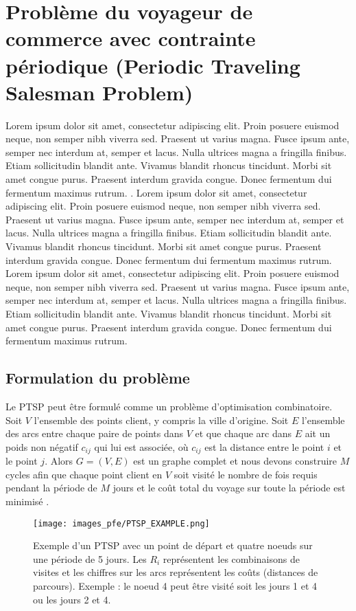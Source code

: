 \section{Problème du voyageur de commerce avec contrainte périodique (Periodic Traveling Salesman Problem)}
\label{sec:ptsp}
Lorem ipsum dolor sit amet, consectetur adipiscing elit. Proin posuere euismod neque, non semper nibh viverra sed. Praesent ut varius magna. Fusce ipsum ante, semper nec interdum at, semper et lacus. Nulla ultrices magna a fringilla finibus. Etiam sollicitudin blandit ante. Vivamus blandit rhoncus tincidunt. Morbi sit amet congue purus. Praesent interdum gravida congue. Donec fermentum dui fermentum maximus rutrum. \parencite{paletta_period_2002}. Lorem ipsum dolor sit amet, consectetur adipiscing elit. Proin posuere euismod neque, non semper nibh viverra sed. Praesent ut varius magna. Fusce ipsum ante, semper nec interdum at, semper et lacus. Nulla ultrices magna a fringilla finibus. Etiam sollicitudin blandit ante. Vivamus blandit rhoncus tincidunt. Morbi sit amet congue purus. Praesent interdum gravida congue. Donec fermentum dui fermentum maximus rutrum. \parencite{cordeau_tabu_1997}Lorem ipsum dolor sit amet, consectetur adipiscing elit. Proin posuere euismod neque, non semper nibh viverra sed. Praesent ut varius magna. Fusce ipsum ante, semper nec interdum at, semper et lacus. Nulla ultrices magna a fringilla finibus. Etiam sollicitudin blandit ante. Vivamus blandit rhoncus tincidunt. Morbi sit amet congue purus. Praesent interdum gravida congue. Donec fermentum dui fermentum maximus rutrum.

\medskip

\subsection{Formulation du problème}
Le PTSP peut être formulé comme un problème d'optimisation combinatoire. Soit $V$ l'ensemble des points client, y compris la ville d'origine. Soit $E$ l'ensemble des arcs entre chaque paire de points dans $V$ et que chaque arc dans $E$ ait un poids non négatif $c_{ij}$ qui lui est associée, où $c_{ij}$ est la distance entre le point $i$ et le point $j$. Alors $G = (V, E)$ est un graphe complet et nous devons construire $M$ cycles afin que chaque point client en $V$ soit visité le nombre de fois requis pendant la période de $M$ jours et le coût total du voyage sur toute la période est minimisé \parencite{chao_new_1995}.

\begin{figure}[hbt!]
  \centering
  \texttt{[image: images\_pfe/PTSP\_EXAMPLE.png]}
  \caption{Exemple d'un PTSP avec un point de départ et quatre noeuds sur une période de 5 jours. Les $R_i$ représentent les combinaisons de visites et les chiffres sur les arcs représentent les coûts (distances de parcours). Exemple : le noeud 4 peut être visité soit les jours 1 et 4 ou les jours 2 et 4. }
  \label{fig:ptsp-first-example}
\end{figure}
\FloatBarrier

